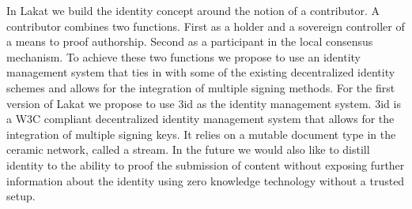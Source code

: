 

In Lakat we build the identity concept around the notion of a contributor. A contributor combines two functions. First as a holder and a sovereign controller of a means to proof authorship. Second as a participant in the local consensus mechanism. To achieve these two functions we propose to use an identity management system that ties in with some of the existing decentralized identity schemes and allows for the integration of multiple signing methods. For the first version of Lakat we propose to use 3id as the identity management system. 3id is a W3C compliant decentralized identity management system that allows for the integration of multiple signing keys. It relies on a mutable document type in the ceramic network, called a stream. In the future we would also like to distill identity to the ability to proof the submission of content without exposing further information about the identity using zero knowledge technology without a trusted setup. 

